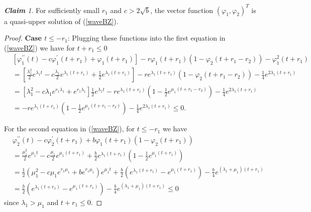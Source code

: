 \documentclass[12pt,letterpaper]{amsart}
\theoremstyle{definition}
\theoremstyle{remark}
\newtheorem{claim}[theorem]{{\bf Claim}}
\numberwithin{equation}{section}
\begin{document}
\begin{claim}\label{claim 6}
For sufficiently small $r_1$ and $c>2\sqrt{b}$, the vector function $(\varphi_1 ,\varphi_2)^T$ is a quasi-upper solution of (\ref{waveBZ}).
\end{claim}
\begin{proof}
{\bf Case $t\le - r_1 $}: 
Plugging these functions into the first equation in (\ref{waveBZ}) we have
for $t+r_1 \leq0$
\begin{align*}
&  \left[
\varphi_{1}^{\prime\prime}(t)-c\varphi_{1}^{\prime}(t+r_1)+\varphi
_{1}(t+r_1)\right]  -r\varphi_{1}(t+r_1)(1-\varphi_{2}(t+r_1-r_2))-\varphi_{1}^{2}(t+r_1)\\
&  =\left[  \frac{\lambda_{1}^{2}}{2}e^{\lambda_{1}t}-c\frac{\lambda_{1}} 
{2}e^{\lambda_{1}(t+r_1)}+\frac{1}{2}e^{\lambda_{1}(t+r_1)}\right]  -re^{\lambda_{1} 
(t+r_1)}\left(  1-\varphi_{2}(t+r_1-r_2)\right)  -\frac{1}{4}e^{2\lambda_{1}(t+r_1)}\\
&  =\left[  \lambda_{1}^{2}-c\lambda_{1}e^{r_1\lambda_1}+e^{r_1\lambda_1}\right]  \frac{1}{2}e^{\lambda_{1} 
t}-re^{\lambda_{1}(t+r_1)}\left(  1-\frac{1}{2} e^{\mu_1(t+r_1-r_2)}\right)  -\frac{1} 
{4}e^{2\lambda_{1}(t+r_1)}\\
&  =-re^{\lambda_{1}(t+r_1)}\left(  1-\frac{1}{2} e^{\mu_1(t+r_1-r_2)}\right)  -\frac{1} 
{4}e^{2\lambda_{1}(t+r_1)}
\leq 0.
\end{align*}

\medskip
For the second equation in (\ref{waveBZ}), for $t\le -r_1$ we have 
\begin{align*}
&  \varphi_{2}^{\prime\prime}(t)-c\varphi_{2}^{\prime}(t+r_1)+b\varphi
_{1}(t+r_1)\left(  1-\varphi_{2}(t+r_1)\right)  \\
&
=\frac{\mu_{1}^{2}}{2}e^{\mu_{1}t}-c\frac{\mu_{1}}{2}e^{\mu_{1}(t+r_1)}+\frac
{b}{2}e^{\lambda_{1}(t+r_1)}\left(  1-\frac{1}{2}e^{\mu_{1}(t+r_1)}\right)  \\
&  =\frac{1}{2}\left( \mu^2_1-c\mu_1e^{r_1\mu_1}+be^{r_1\mu_1} \right)  e^{\mu_1t} 
+\frac{b}{2} \left(  e^{\lambda_1(t+r_1)} -e^{\mu_1(t+r_1)}     \right)
-\frac{b}{4} e^{(\lambda_1+\mu_1)(t+r_1)}\\
& = \frac{b}{2} \left(  e^{\lambda_1(t+r_1)} -e^{\mu_1(t+r_1)}     \right)
-\frac{b}{4} e^{(\lambda_1+\mu_1)(t+r_1)} \le 0
\end{align*}
since $\lambda_1 >\mu_1$ and $t+r_1 \le 0$.


\end{proof}
\end{document}
